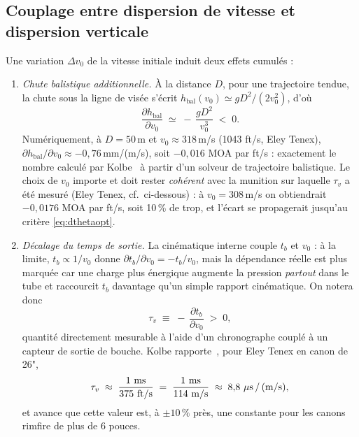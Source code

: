\documentclass[12pt,a4paper]{article}
\begin{document}
	\subsection{Couplage entre dispersion de vitesse et dispersion verticale}
	\label{sec:couplage}

	Une variation $\Delta v_0$ de la vitesse initiale induit deux effets cumulés :
	\begin{enumerate}
		\item \emph{Chute balistique additionnelle.} À la distance $D$, pour une trajectoire tendue, la chute sous la ligne de visée s'écrit $h_\text{bal}(v_0) \simeq g D^2/(2 v_0^2)$, d'où
		\begin{equation}
			\label{eq:dhbal}
			\frac{\partial h_\text{bal}}{\partial v_0} \;\simeq\; -\,\frac{g D^2}{v_0^3} \;<\;0.
		\end{equation}
		Numériquement, à $D=50$\,m et $v_0 \approx 318$\,m/s (1043 ft/s, Eley Tenex), $\partial h_\text{bal}/\partial v_0 \approx -0{,}76$\,mm/(m/s), soit $-0{,}016$ MOA par ft/s : exactement le nombre calculé par Kolbe~\cite{Kolbe} à partir d'un solveur de trajectoire balistique. Le choix de $v_0$ importe et doit rester \emph{cohérent} avec la munition sur laquelle $\tau_v$ a été mesuré (Eley Tenex, cf.\ ci-dessous) : à $v_0 = 308$\,m/s on obtiendrait $-0{,}0176$ MOA par ft/s, soit 10\,\% de trop, et l'écart se propagerait jusqu'au critère \eqref{eq:dthetaopt}.
		\item \emph{Décalage du temps de sortie.} La cinématique interne couple $t_b$ et $v_0$ : à la limite, $t_b \propto 1/v_0$ donne $\partial t_b/\partial v_0 = -t_b/v_0$, mais la dépendance réelle est plus marquée car une charge plus énergique augmente la pression \emph{partout} dans le tube et raccourcit $t_b$ davantage qu'un simple rapport cinématique. On notera donc
		\begin{equation}
			\tau_v \;\equiv\; -\,\frac{\partial t_b}{\partial v_0} \;>\; 0,
		\end{equation}
		quantité directement mesurable à l'aide d'un chronographe couplé à un capteur de sortie de bouche. Kolbe rapporte~\cite{Kolbe}, pour Eley Tenex en canon de 26",
		\begin{equation}
			\tau_v \;\approx\; \frac{1\ \text{ms}}{375\ \text{ft/s}} \;=\; \frac{1\ \text{ms}}{114\ \text{m/s}} \;\approx\; 8{,}8\ \mu\text{s\,/\,(m/s)},
		\end{equation}
		et avance que cette valeur est, à $\pm 10\,\%$ près, une constante pour les canons rimfire de plus de 6 pouces.
	\end{enumerate}
\end{document}
